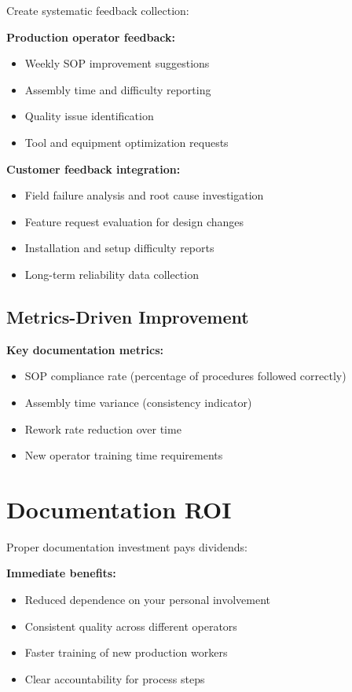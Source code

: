 Create systematic feedback collection:

\textbf{Production operator feedback:}
\begin{itemize}
\item Weekly SOP improvement suggestions
\item Assembly time and difficulty reporting
\item Quality issue identification
\item Tool and equipment optimization requests
\end{itemize}

\textbf{Customer feedback integration:}
\begin{itemize}
\item Field failure analysis and root cause investigation
\item Feature request evaluation for design changes
\item Installation and setup difficulty reports
\item Long-term reliability data collection
\end{itemize}

\subsection{Metrics-Driven Improvement}

\textbf{Key documentation metrics:}
\begin{itemize}
\item SOP compliance rate (percentage of procedures followed correctly)
\item Assembly time variance (consistency indicator)
\item Rework rate reduction over time
\item New operator training time requirements
\end{itemize}

\section{Documentation ROI}

Proper documentation investment pays dividends:

\textbf{Immediate benefits:}
\begin{itemize}
\item Reduced dependence on your personal involvement
\item Consistent quality across different operators
\item Faster training of new production workers
\item Clear accountability for process steps
\end{itemize}

